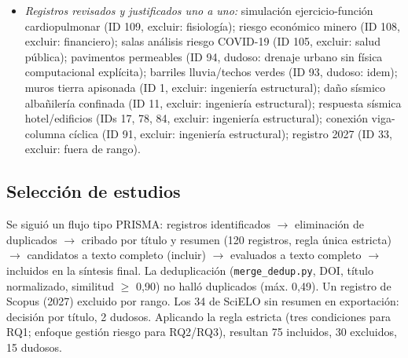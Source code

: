 \documentclass[12pt,a4paper]{article}
\begin{document}
\begin{itemize}
  \item \textit{Registros revisados y justificados uno a uno:} simulación ejercicio-función cardiopulmonar (ID 109, excluir: fisiología); riesgo económico minero (ID 108, excluir: financiero); salas análisis riesgo COVID-19 (ID 105, excluir: salud pública); pavimentos permeables (ID 94, dudoso: drenaje urbano sin física computacional explícita); barriles lluvia/techos verdes (ID 93, dudoso: idem); muros tierra apisonada (ID 1, excluir: ingeniería estructural); daño sísmico albañilería confinada (ID 11, excluir: ingeniería estructural); respuesta sísmica hotel/edificios (IDs 17, 78, 84, excluir: ingeniería estructural); conexión viga-columna cíclica (ID 91, excluir: ingeniería estructural); registro 2027 (ID 33, excluir: fuera de rango).
\end{itemize}

\subsection{Selección de estudios}
Se siguió un flujo tipo PRISMA: registros identificados $\rightarrow$ eliminación de duplicados $\rightarrow$ cribado por título y resumen (120 registros, regla única estricta) $\rightarrow$ candidatos a texto completo (incluir) $\rightarrow$ evaluados a texto completo $\rightarrow$ incluidos en la síntesis final. La deduplicación (\texttt{merge\_dedup.py}, DOI, título normalizado, similitud $\ge$ 0,90) no halló duplicados (máx. 0,49). Un registro de Scopus (2027) excluido por rango. Los 34 de SciELO sin resumen en exportación: decisión por título, 2 dudosos. Aplicando la regla estricta (tres condiciones para RQ1; enfoque gestión riesgo para RQ2/RQ3), resultan 75 incluidos, 30 excluidos, 15 dudosos.
\end{document}
